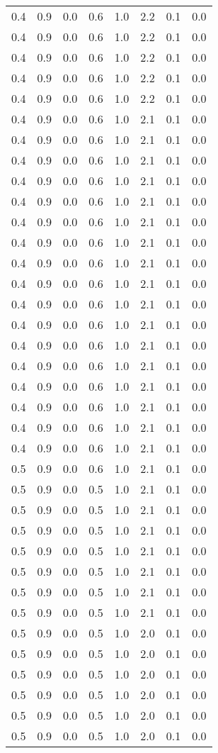 \begin{tabular}{L{1in}|L{1in}|L{1in}|L{1in}|L{1in}|L{1in}|L{1in}|L{1in}}
0.4&0.9&0.0&0.6&1.0&2.2&0.1&0.0\\
0.4&0.9&0.0&0.6&1.0&2.2&0.1&0.0\\
0.4&0.9&0.0&0.6&1.0&2.2&0.1&0.0\\
0.4&0.9&0.0&0.6&1.0&2.2&0.1&0.0\\
0.4&0.9&0.0&0.6&1.0&2.2&0.1&0.0\\
0.4&0.9&0.0&0.6&1.0&2.1&0.1&0.0\\
0.4&0.9&0.0&0.6&1.0&2.1&0.1&0.0\\
0.4&0.9&0.0&0.6&1.0&2.1&0.1&0.0\\
0.4&0.9&0.0&0.6&1.0&2.1&0.1&0.0\\
0.4&0.9&0.0&0.6&1.0&2.1&0.1&0.0\\
0.4&0.9&0.0&0.6&1.0&2.1&0.1&0.0\\
0.4&0.9&0.0&0.6&1.0&2.1&0.1&0.0\\
0.4&0.9&0.0&0.6&1.0&2.1&0.1&0.0\\
0.4&0.9&0.0&0.6&1.0&2.1&0.1&0.0\\
0.4&0.9&0.0&0.6&1.0&2.1&0.1&0.0\\
0.4&0.9&0.0&0.6&1.0&2.1&0.1&0.0\\
0.4&0.9&0.0&0.6&1.0&2.1&0.1&0.0\\
0.4&0.9&0.0&0.6&1.0&2.1&0.1&0.0\\
0.4&0.9&0.0&0.6&1.0&2.1&0.1&0.0\\
0.4&0.9&0.0&0.6&1.0&2.1&0.1&0.0\\
0.4&0.9&0.0&0.6&1.0&2.1&0.1&0.0\\
0.4&0.9&0.0&0.6&1.0&2.1&0.1&0.0\\
0.5&0.9&0.0&0.6&1.0&2.1&0.1&0.0\\
0.5&0.9&0.0&0.5&1.0&2.1&0.1&0.0\\
0.5&0.9&0.0&0.5&1.0&2.1&0.1&0.0\\
0.5&0.9&0.0&0.5&1.0&2.1&0.1&0.0\\
0.5&0.9&0.0&0.5&1.0&2.1&0.1&0.0\\
0.5&0.9&0.0&0.5&1.0&2.1&0.1&0.0\\
0.5&0.9&0.0&0.5&1.0&2.1&0.1&0.0\\
0.5&0.9&0.0&0.5&1.0&2.1&0.1&0.0\\
0.5&0.9&0.0&0.5&1.0&2.0&0.1&0.0\\
0.5&0.9&0.0&0.5&1.0&2.0&0.1&0.0\\
0.5&0.9&0.0&0.5&1.0&2.0&0.1&0.0\\
0.5&0.9&0.0&0.5&1.0&2.0&0.1&0.0\\
0.5&0.9&0.0&0.5&1.0&2.0&0.1&0.0\\
0.5&0.9&0.0&0.5&1.0&2.0&0.1&0.0\\

\end{tabular}

